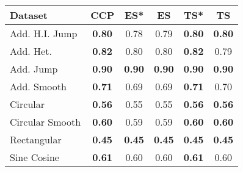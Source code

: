 \begin{tabular}{lccccc}
\toprule
Dataset & CCP & ES* & ES & TS* & TS \\
\midrule
Add. H.I. Jump & \textbf{0.80} & 0.78 & 0.79 & \textbf{0.80} & \textbf{0.80} \\
Add. Het. & \textbf{0.82} & 0.80 & 0.80 & \textbf{0.82} & 0.79 \\
Add. Jump & \textbf{0.90} & \textbf{0.90} & \textbf{0.90} & \textbf{0.90} & \textbf{0.90} \\
Add. Smooth & \textbf{0.71} & 0.69 & 0.69 & \textbf{0.71} & 0.70 \\
Circular & \textbf{0.56} & 0.55 & 0.55 & \textbf{0.56} & \textbf{0.56} \\
Circular Smooth & \textbf{0.60} & 0.59 & 0.59 & \textbf{0.60} & \textbf{0.60} \\
Rectangular & \textbf{0.45} & \textbf{0.45} & \textbf{0.45} & \textbf{0.45} & \textbf{0.45} \\
Sine Cosine & \textbf{0.61} & 0.60 & 0.60 & \textbf{0.61} & 0.60 \\
\bottomrule
\end{tabular}